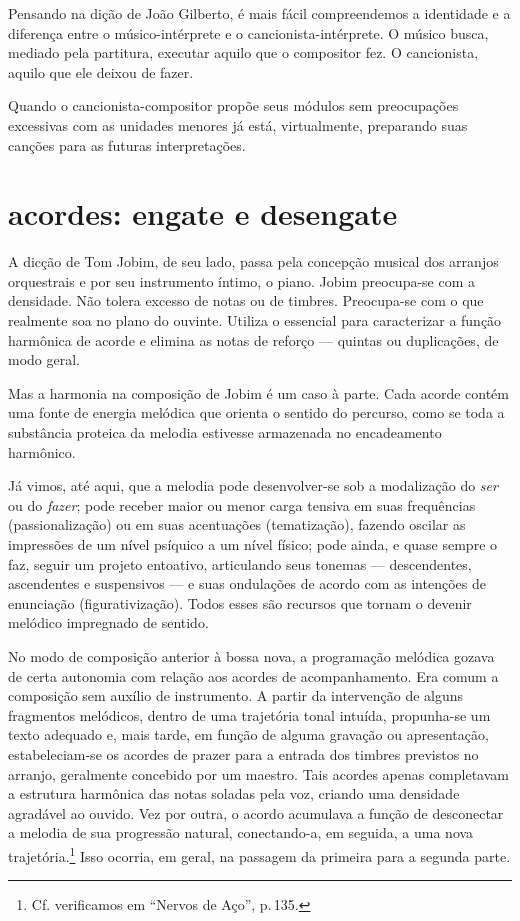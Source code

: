 Pensando na dição de João Gilberto, é mais fácil compreendemos a
identidade e a diferença entre o músico-intérprete e o
cancionista-intérprete. O músico busca, mediado pela partitura, executar
aquilo que o compositor fez. O cancionista, aquilo que ele deixou de
fazer.

Quando o cancionista-compositor propõe seus módulos sem preocupações
excessivas com as unidades menores já está, virtualmente, preparando
suas canções para as futuras interpretações.

\section{acordes: engate e desengate}

A dicção de Tom Jobim, de seu lado, passa pela concepção musical dos
arranjos orquestrais e por seu instrumento íntimo, o piano. Jobim
preocupa-se com a densidade. Não tolera excesso de notas ou de timbres.
Preocupa-se com o que realmente soa no plano do ouvinte. Utiliza o
essencial para caracterizar a função harmônica de acorde e elimina as
notas de reforço --- quintas ou duplicações, de modo geral.

Mas a harmonia na composição de Jobim é um caso à parte. Cada acorde
contém uma fonte de energia melódica que orienta o sentido do percurso,
como se toda a substância proteica da melodia estivesse armazenada no
encadeamento harmônico.

Já vimos, até aqui, que a melodia pode desenvolver-se sob a modalização
do \textit{ser} ou do \textit{fazer}; pode receber maior ou menor carga tensiva em suas
frequências (passionalização) ou em suas acentuações (tematização),
fazendo oscilar as impressões de um nível psíquico a um nível físico;
pode ainda, e quase sempre o faz, seguir um projeto entoativo,
articulando seus tonemas --- descendentes, ascendentes e suspensivos --- e
suas ondulações de acordo com as intenções de enunciação
(figurativização). Todos esses são recursos que tornam o devenir
melódico impregnado de sentido.

No modo de composição anterior à bossa nova, a programação melódica
gozava de certa autonomia com relação aos acordes de acompanhamento. Era
comum a composição sem auxílio de instrumento. A partir da intervenção
de alguns fragmentos melódicos, dentro de uma trajetória tonal intuída,
propunha-se um texto adequado e, mais tarde, em função de alguma
gravação ou apresentação, estabeleciam-se os acordes de prazer para a
entrada dos timbres previstos no arranjo, geralmente concebido por um
maestro. Tais acordes apenas completavam a estrutura harmônica das
notas soladas pela voz, criando uma densidade agradável ao ouvido. Vez
por outra, o acordo acumulava a função de desconectar a melodia de sua
progressão natural, conectando-a, em seguida, a uma nova trajetória.\footnote{Cf. verificamos em ``Nervos de Aço'', 
p.\,135.} Isso ocorria, em geral,
na passagem da primeira para a segunda parte.

